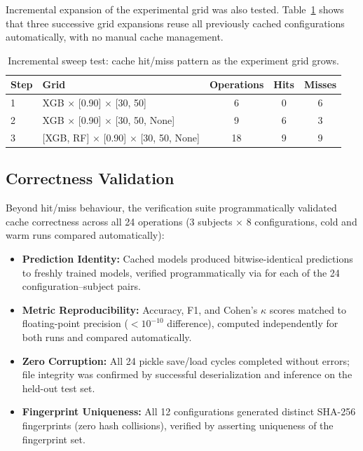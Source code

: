 Incremental expansion of the experimental grid was also tested.
Table~\ref{tab:incremental_sweep} shows that three successive grid
expansions reuse all previously cached configurations automatically, with
no manual cache management.

\begin{table}[htbp]
\centering
\caption[Incremental sweep test: partial cache reuse]{Incremental sweep test: cache hit/miss pattern as the experiment
grid grows.}
\label{tab:incremental_sweep}
\begin{tabular}{llccc}
\toprule
\textbf{Step} & \textbf{Grid} & \textbf{Operations} & \textbf{Hits} & \textbf{Misses} \\
\midrule
1 & XGB $\times$ [0.90] $\times$ [30, 50] & 6 & 0 & 6 \\
2 & XGB $\times$ [0.90] $\times$ [30, 50, None] & 9 & 6 & 3 \\
3 & [XGB, RF] $\times$ [0.90] $\times$ [30, 50, None] & 18 & 9 & 9 \\
\bottomrule
\end{tabular}
\end{table}

\subsection{Correctness Validation}

Beyond hit/miss behaviour, the verification suite programmatically validated
cache correctness across all 24 operations (3 subjects $\times$ 8 configurations,
cold and warm runs compared automatically):

\begin{itemize}
\item \textbf{Prediction Identity:} Cached models produced bitwise-identical
 predictions to freshly trained models, verified programmatically via  for each of the 24
 configuration--subject pairs.
\item \textbf{Metric Reproducibility:} Accuracy, F1, and Cohen's $\kappa$ scores
 matched to floating-point precision ($<10^{-10}$ difference), computed
 independently for both runs and compared automatically.
\item \textbf{Zero Corruption:} All 24 pickle save/load cycles completed without
 errors; file integrity was confirmed by successful deserialization and
 inference on the held-out test set.
\item \textbf{Fingerprint Uniqueness:} All 12 configurations generated distinct
 SHA-256 fingerprints (zero hash collisions), verified by asserting
 uniqueness of the fingerprint set.
\end{itemize}

